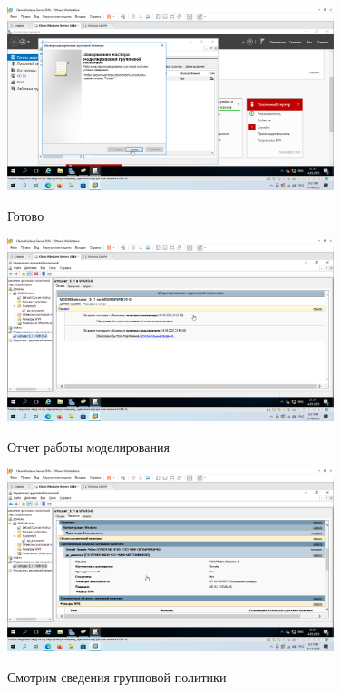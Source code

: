 \documentclass[a4paper]{article}
\begin{document}
  \begin{figure}[H]
    \centering
    \includegraphics[width=0.85\textwidth]{5_0132}
    \label{img:132}
    \caption{Готово}
  \end{figure}

  \begin{figure}[H]
    \centering
    \includegraphics[width=0.85\textwidth]{5_0133}
    \label{img:133}
    \caption{Отчет работы моделирования}
  \end{figure}

  \begin{figure}[H]
    \centering
    \includegraphics[width=0.85\textwidth]{5_0134}
    \label{img:134}
    \caption{Смотрим сведения групповой политики}
  \end{figure}
\end{document}
